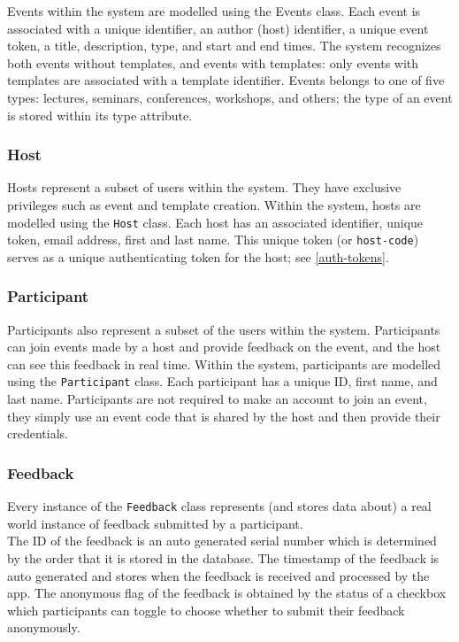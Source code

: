 \documentclass[9pt, titlepage]{extarticle}
\begin{document}
Events within the system are modelled using the Events class. Each event is associated with a unique identifier, an author (host) identifier, a unique event token, a title, description, type, and start and end times. The system recognizes both events without templates, and events with templates: only events with templates are associated with a template identifier. Events belongs to one of five types: lectures, seminars, conferences, workshops, and others; the type of an event is stored within its type attribute. 

\subsubsection{Host}

Hosts represent a subset of users within the system. They have exclusive privileges such as event and template creation. Within the system, hosts are modelled using the \texttt{Host} class. Each host has an associated identifier, unique token, email address, first and last name. This unique token (or \texttt{host-code}) serves as a unique authenticating token for the host; see \autoref{auth-tokens}.

\subsubsection{Participant}

Participants also represent a subset of the users within the system. Participants can join events made by a host and provide feedback on the event, and the host can see this feedback in real time. Within the system, participants are modelled using the \texttt{Participant} class. Each participant has a unique ID, first name, and last name. Participants are not required to make an account to join an event, they simply use an event code that is shared by the host and then provide their credentials.

\subsubsection{Feedback} \label{sec:feedback}

Every instance of the \texttt{Feedback} class represents (and stores data about) a real world instance of feedback submitted by a participant.\\

The ID of the feedback is an auto generated serial number which is determined by the order that it is stored in the database. The timestamp of the feedback is auto generated and stores when the feedback is received and processed by the app. The anonymous flag of the feedback is obtained by the status of a checkbox which participants can toggle to choose whether to submit their feedback anonymously.\\
\end{document}
